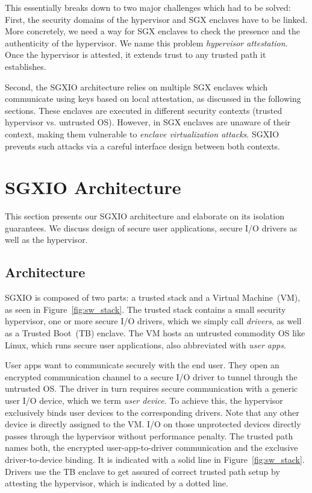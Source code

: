 \documentclass{sig-alternate-05-2015}
\begin{document}
This essentially breaks down to two major challenges which had to be solved: 
First, the security domains of the hypervisor and SGX enclaves have to be linked. 
More concretely, we need a way for SGX enclaves to check the presence and the authenticity of the hypervisor. 
We name this problem \emph{hypervisor attestation}. 
Once the hypervisor is attested, it extends trust to any trusted path it establishes. 

Second, the SGXIO architecture relies on multiple SGX enclaves which communicate using keys based on local attestation, as discussed in the following sections. 
These enclaves are executed in different security contexts (trusted hypervisor vs. untrusted OS). 
However, in SGX enclaves are unaware of their context, making them vulnerable to \emph{enclave virtualization attacks}. 
SGXIO prevents such attacks via a careful interface design between both contexts.


\section{SGXIO Architecture}\label{sec:arch}

This section presents our SGXIO architecture and elaborate on its isolation guarantees. 
We discuss design of secure user applications, secure I/O drivers as well as the hypervisor. 

\subsection{Architecture}
SGXIO is composed of two parts: a trusted stack and a Virtual Machine~(VM), as seen in Figure~\ref{fig:sw_stack}. 
The trusted stack contains a small security hypervisor, one or more secure I/O drivers, which we simply call \emph{drivers}, as well as a Trusted Boot~(TB) enclave. 
The VM hosts an untrusted commodity OS like Linux, which runs secure user applications, also abbreviated with \emph{user apps}. 

User apps want to communicate securely with the end user. 
They open an encrypted communication channel to a secure I/O driver to tunnel through the untrusted OS. 
The driver in turn requires secure communication with a generic user I/O device, which we term \emph{user device}. 
To achieve this, the hypervisor exclusively binds user devices to the corresponding drivers. 
Note that any other device is directly assigned to the VM. 
I/O on those unprotected devices directly passes through the hypervisor without performance penalty. 
The trusted path names both, the encrypted user-app-to-driver communication and the exclusive driver-to-device binding. 
It is indicated with a solid line in Figure~\ref{fig:sw_stack}. 
Drivers use the TB enclave to get assured of correct trusted path setup by attesting the hypervisor, which is indicated by a dotted line.
\end{document}
